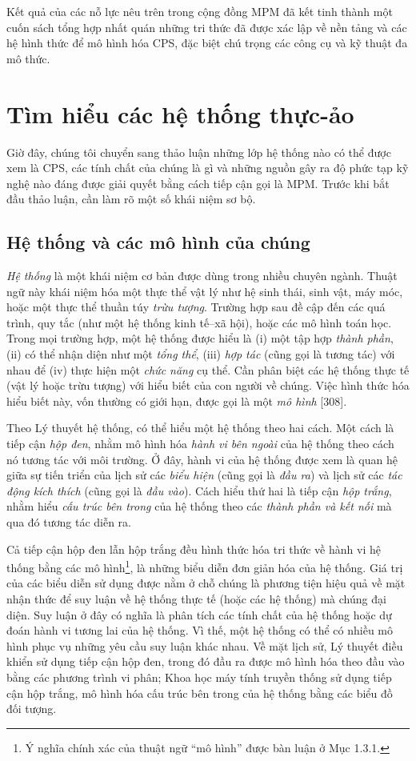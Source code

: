 Kết quả của các nỗ lực nêu trên trong cộng đồng MPM đã kết tinh thành một cuốn sách tổng hợp nhất quán những tri thức đã được xác lập về nền tảng và các hệ hình thức để mô hình hóa CPS, đặc biệt chú trọng các công cụ và kỹ thuật đa mô thức.

\section{Tìm hiểu các hệ thống thực-ảo}
Giờ đây, chúng tôi chuyển sang thảo luận những lớp hệ thống nào có thể được xem là CPS, các tính chất của chúng là gì và những nguồn gây ra độ phức tạp kỹ nghệ nào đáng được giải quyết bằng cách tiếp cận gọi là MPM. Trước khi bắt đầu thảo luận, cần làm rõ một số khái niệm sơ bộ.

\subsection{Hệ thống và các mô hình của chúng}
\emph{Hệ thống} là một khái niệm cơ bản được dùng trong nhiều chuyên ngành. Thuật ngữ này khái niệm hóa một thực thể vật lý như hệ sinh thái, sinh vật, máy móc, hoặc một thực thể thuần túy \emph{trừu tượng}. Trường hợp sau đề cập đến các quá trình, quy tắc (như một hệ thống kinh tế--xã hội), hoặc các mô hình toán học. Trong mọi trường hợp, một hệ thống được hiểu là (i) một tập hợp \emph{thành phần}, (ii) có thể nhận diện như một \emph{tổng thể}, (iii) \emph{hợp tác} (cũng gọi là tương tác) với nhau để (iv) thực hiện một \emph{chức năng} cụ thể. Cần phân biệt các hệ thống thực tế (vật lý hoặc trừu tượng) với hiểu biết của con người về chúng. Việc hình thức hóa hiểu biết này, vốn thường có giới hạn, được gọi là một \emph{mô hình} [308].

Theo Lý thuyết hệ thống, có thể hiểu một hệ thống theo hai cách. Một cách là tiếp cận \emph{hộp đen}, nhằm mô hình hóa \emph{hành vi bên ngoài} của hệ thống theo cách nó tương tác với môi trường. Ở đây, hành vi của hệ thống được xem là quan hệ giữa sự tiến triển của lịch sử các \emph{biểu hiện} (cũng gọi là \emph{đầu ra}) và lịch sử các \emph{tác động kích thích} (cũng gọi là \emph{đầu vào}). Cách hiểu thứ hai là tiếp cận \emph{hộp trắng}, nhằm hiểu \emph{cấu trúc bên trong} của hệ thống theo các \emph{thành phần và kết nối} mà qua đó tương tác diễn ra.

Cả tiếp cận hộp đen lẫn hộp trắng đều hình thức hóa tri thức về hành vi hệ thống bằng các mô hình\footnote{Ý nghĩa chính xác của thuật ngữ ``mô hình'' được bàn luận ở Mục 1.3.1.}, là những biểu diễn đơn giản hóa của hệ thống. Giá trị của các biểu diễn sử dụng được nằm ở chỗ chúng là phương tiện hiệu quả về mặt nhận thức để suy luận về hệ thống thực tế (hoặc các hệ thống) mà chúng đại diện. Suy luận ở đây có nghĩa là phân tích các tính chất của hệ thống hoặc dự đoán hành vi tương lai của hệ thống. Vì thế, một hệ thống có thể có nhiều mô hình phục vụ những yêu cầu suy luận khác nhau. Về mặt lịch sử, Lý thuyết điều khiển sử dụng tiếp cận hộp đen, trong đó đầu ra được mô hình hóa theo đầu vào bằng các phương trình vi phân; Khoa học máy tính truyền thống sử dụng tiếp cận hộp trắng, mô hình hóa cấu trúc bên trong của hệ thống bằng các biểu đồ đối tượng.

